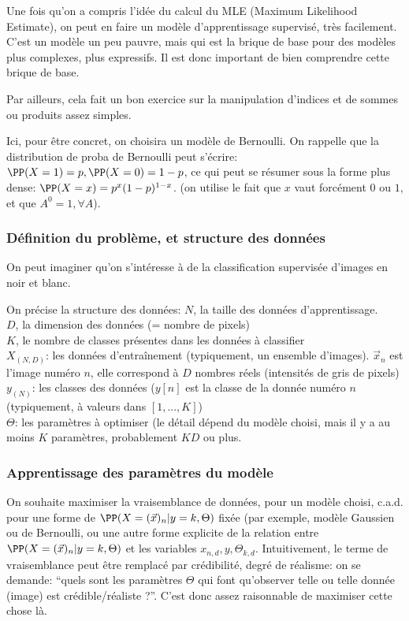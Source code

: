 \documentclass[french,twoside]{article}
\begin{document}
Une fois qu'on a compris l'idée du calcul du MLE (Maximum Likelihood Estimate), on peut en faire un modèle d'apprentissage supervisé, très facilement.
C'est un modèle un peu pauvre, mais qui est la brique de base pour des modèles plus complexes, plus expressifs. Il est donc important de bien comprendre cette brique de base.

Par ailleurs, cela fait un bon exercice sur la manipulation d'indices et de sommes ou produits assez simples.

Ici, pour être concret, on choisira un modèle de Bernoulli.
On rappelle que la distribution de proba de Bernoulli peut s'écrire:
$\PP(X=1)=p, \PP(X=0)=1-p$, ce qui peut se résumer sous la forme plus dense:
$\PP(X=x)= p^{x} (1-p)^{1-x}$. (on utilise le fait que $x$ vaut forcément $0$ ou $1$, et que $A^0=1, \forall A$).

\subsubsection{Définition du problème, et structure des données}

On peut imaginer qu'on s'intéresse à de la classification supervisée d'images en noir et blanc.

On précise la structure des données:
$N$, la taille des données d'apprentissage.\\
$D$, la dimension des données (= nombre de pixels)\\
$K$, le nombre de classes présentes dans les données à classifier
\\
$X_{(N,D)}$: les données d'entraînement (typiquement, un ensemble d'images). $\vec{x}_n$ est l'image numéro $n$, elle correspond à $D$ nombres réels (intensités de gris de pixels)\\
$y_{(N)}$: les classes des données ($y[n]$ est la classe de la donnée numéro $n$ (typiquement, à valeurs dans $[1,...,K]$)\\
$\Theta$: les paramètres à optimiser (le détail dépend du modèle choisi, mais il y a au moins $K$ paramètres, probablement $KD$ ou plus.\\

\subsubsection{Apprentissage des paramètres du modèle}

On souhaite maximiser la vraisemblance de données, pour un modèle choisi, c.a.d. pour une forme de $\PP(X=(\vec{x})_n | y=k, \Theta)$ fixée (par exemple, modèle Gaussien ou de Bernoulli, ou une autre forme explicite de la relation entre $\PP(X=(\vec{x})_n | y=k, \Theta)$ et les variables $x_{n,d}, y, \Theta_{k,d}$.
Intuitivement, le terme de vraisemblance peut être remplacé par crédibilité, degré de réalisme: on se demande: ``quels sont les paramètres $\Theta$ qui font qu'observer telle ou telle donnée (image) est crédible/réaliste ?''. C'est donc assez raisonnable de maximiser cette chose là.\\
\end{document}
